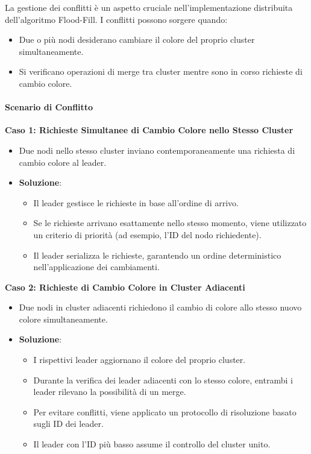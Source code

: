 \documentclass[12pt, a4paper]{report}
\begin{document}
La gestione dei conflitti è un aspetto cruciale nell'implementazione distribuita dell'algoritmo Flood-Fill. I conflitti possono sorgere quando:

\begin{itemize}
    \item Due o più nodi desiderano cambiare il colore del proprio cluster simultaneamente.
    \item Si verificano operazioni di merge tra cluster mentre sono in corso richieste di cambio colore.
\end{itemize}

\paragraph{Scenario di Conflitto}

\textbf{Caso 1: Richieste Simultanee di Cambio Colore nello Stesso Cluster}

\begin{itemize}
    \item Due nodi nello stesso cluster inviano contemporaneamente una richiesta di cambio colore al leader.
    \item \textbf{Soluzione}:
    \begin{itemize}
        \item Il leader gestisce le richieste in base all'ordine di arrivo.
        \item Se le richieste arrivano esattamente nello stesso momento, viene utilizzato un criterio di priorità (ad esempio, l'ID del nodo richiedente).
        \item Il leader serializza le richieste, garantendo un ordine deterministico nell'applicazione dei cambiamenti.
    \end{itemize}
\end{itemize}

\textbf{Caso 2: Richieste di Cambio Colore in Cluster Adiacenti}

\begin{itemize}
    \item Due nodi in cluster adiacenti richiedono il cambio di colore allo stesso nuovo colore simultaneamente.
    \item \textbf{Soluzione}:
    \begin{itemize}
        \item I rispettivi leader aggiornano il colore del proprio cluster.
        \item Durante la verifica dei leader adiacenti con lo stesso colore, entrambi i leader rilevano la possibilità di un merge.
        \item Per evitare conflitti, viene applicato un protocollo di risoluzione basato sugli ID dei leader.
        \item Il leader con l'ID più basso assume il controllo del cluster unito.
    \end{itemize}
\end{itemize}
\end{document}
